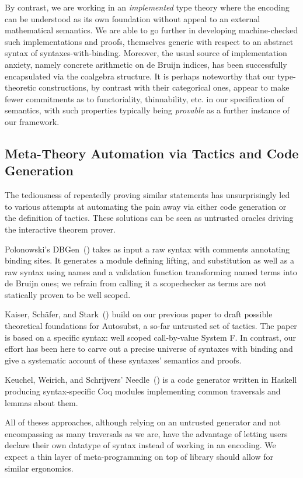 By contrast, we are working in an \emph{implemented} type theory where the
encoding can be understood as its own foundation without appeal to an external
mathematical semantics. We are able to go further in developing machine-checked
such implementations and proofs, themselves generic with respect to an abstract syntax
 of syntaxes-with-binding. Moreover, the usual source of implementation
anxiety, namely concrete arithmetic on de Bruijn indices, has been successfully
encapsulated via the  coalgebra structure. It is perhaps noteworthy that
our type-theoretic constructions, by contrast with their categorical ones,
appear to make fewer commitments as to functoriality, thinnability, etc. in our
specification of semantics, with such properties typically being \emph{provable}
as a further instance of our framework.

\subsection{Meta-Theory Automation via Tactics and Code Generation} The
tediousness of repeatedly
proving similar statements has unsurprisingly led to various attempts at
automating the pain away via either code generation or the definition of
tactics. These solutions can be seen as untrusted oracles driving the
interactive theorem prover.

Polonowski's DBGen~(\citeyear{polonowski:db}) takes as input a raw syntax with
comments annotating binding sites. It generates a module defining lifting,
and substitution as well as a raw syntax using names and a validation function
transforming named terms into de Bruijn ones; we refrain from calling it a
scopechecker as terms are not statically proven to be well scoped.


Kaiser, Schäfer, and Stark~(\citeyear{Kaiser-wsdebr}) build on our previous paper
to draft possible theoretical foundations for Autosubst, a so-far untrusted
set of tactics. The paper is based on a specific syntax: well scoped call-by-value
System F. In contrast, our effort has been here to carve out
a precise universe of syntaxes with binding and give a systematic account
of these syntaxes' semantics and proofs.

Keuchel, Weirich, and Schrijvers' Needle~(\citeyear{needleandknot}) is a code
generator written in Haskell producing syntax-specific Coq modules
implementing common traversals and lemmas about them.

All of theses approaches, although relying on an untrusted generator and
not encompassing as many traversals as we are, have the advantage of letting
users declare their own datatype of syntax instead of working in an encoding.
%
We expect a thin layer of meta-programming on top of library should allow for
similar ergonomics.


